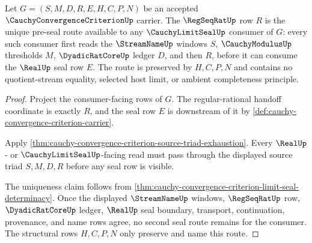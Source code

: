 \begin{theorem}
\label{thm:cauchy-convergence-criterion-regular-seal-handoff}
Let $G=(S,M,D,R,E,H,C,P,N)$ be an accepted $\CauchyConvergenceCriterionUp$ carrier. The $\RegSeqRatUp$ row $R$ is the unique pre-seal route available to any $\CauchyLimitSealUp$ consumer of $G$: every such consumer first reads the $\StreamNameUp$ windows $S$, $\CauchyModulusUp$ thresholds $M$, $\DyadicRatCoreUp$ ledger $D$, and then $R$, before it can consume the $\RealUp$ seal row $E$. The route is preserved by $H,C,P,N$ and contains no quotient-stream equality, selected host limit, or ambient completeness principle.
\end{theorem}
\begin{proof}
Project the consumer-facing rows of $G$. The regular-rational handoff coordinate is exactly $R$, and the seal row $E$ is downstream of it by \autoref{def:cauchy-convergence-criterion-carrier}.

Apply \autoref{thm:cauchy-convergence-criterion-source-triad-exhaustion}. Every $\RealUp$- or $\CauchyLimitSealUp$-facing read must pass through the displayed source triad $S,M,D,R$ before any seal row is visible.

The uniqueness claim follows from \autoref{thm:cauchy-convergence-criterion-limit-seal-determinacy}. Once the displayed $\StreamNameUp$ windows, $\RegSeqRatUp$ row, $\DyadicRatCoreUp$ ledger, $\RealUp$ seal boundary, transport, continuation, provenance, and name rows agree, no second seal route remains for the consumer. The structural rows $H,C,P,N$ only preserve and name this route.
\end{proof}


